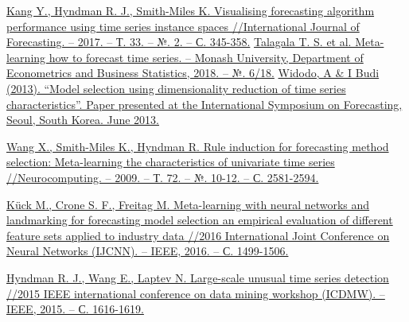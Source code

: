 \documentclass[a4paper,12pt]{article}
\begin{document}
	\begin{thebibliography}{99}
	 \href{https://www.researchgate.net/profile/Yanfei_Kang/publication/312449797_Visualising_forecasting_algorithm_performance_using_time_series_instance_spaces/links/5b03b9d8a6fdccf9e4f78451/Visualising-forecasting-algorithm-performance-using-time-series-instance-spaces.pdf}{Kang Y., Hyndman R. J., Smith-Miles K. Visualising forecasting algorithm performance using time series instance spaces //International Journal of Forecasting. – 2017. – Т. 33. – №. 2. – С. 345-358.} 
	\href{https://www.monash.edu/business/ebs/research/publications/ebs/wp06-2018.pdf}{Talagala T. S. et al. Meta-learning how to forecast time series. – Monash University, Department of Econometrics and Business Statistics, 2018. – №. 6/18.}
	\href{https://forecasters.org/wp-content/uploads/gravity_forms/7-2a51b93047891f1ec3608bdbd77ca58d/2013/07/Widodo_Agus_ISF2013.pdf}{Widodo, A \& I Budi (2013). “Model selection using dimensionality reduction of time series
		characteristics”. Paper presented at the International Symposium on Forecasting, Seoul,
		South Korea. June 2013.}

	
	\href{http://citeseerx.ist.psu.edu/viewdoc/download?doi=10.1.1.111.2000&rep=rep1&type=pdf}{Wang X., Smith-Miles K., Hyndman R. Rule induction for forecasting method selection: Meta-learning the characteristics of univariate time series //Neurocomputing. – 2009. – Т. 72. – №. 10-12. – С. 2581-2594.}

	
	\href{https://www.researchgate.net/profile/Sven_Crone/publication/301549075_Meta-Learning_with_Neural_Networks_and_Landmarking_for_Forecasting_Model_Selection_-_An_Empirical_Evaluation_of_Different_Feature_Sets_Applied_to_Industry_Data/links/5a8d8a6eaca272c56bc30fba/Meta-Learning-with-Neural-Networks-and-Landmarking-for-Forecasting-Model-Selection-An-Empirical-Evaluation-of-Different-Feature-Sets-Applied-to-Industry-Data.pdf}{Kück M., Crone S. F., Freitag M. Meta-learning with neural networks and landmarking for forecasting model selection an empirical evaluation of different feature sets applied to industry data //2016 International Joint Conference on Neural Networks (IJCNN). – IEEE, 2016. – С. 1499-1506.
}
	
	
		\href{https://robjhyndman.com/papers/icdm2015.pdf}{	Hyndman R. J., Wang E., Laptev N. Large-scale unusual time series detection //2015 IEEE international conference on data mining workshop (ICDMW). – IEEE, 2015. – С. 1616-1619.}
		

\end{thebibliography}
\end{document}
